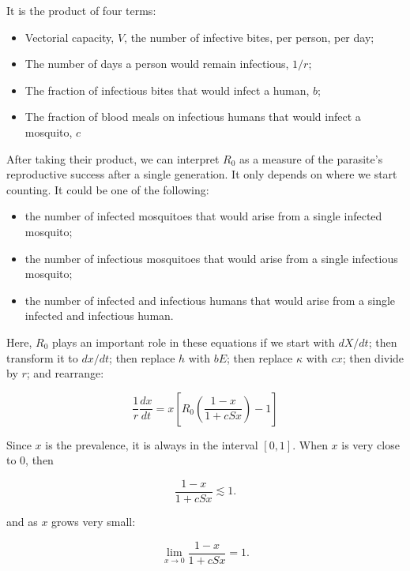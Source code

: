 \documentclass[
]{book}
\begin{document}
It is the product of four terms:

\begin{itemize}
\item
  Vectorial capacity, \(V\), the number of infective bites, per person, per day;
\item
  The number of days a person would remain infectious, \(1/r\);
\item
  The fraction of infectious bites that would infect a human, \(b\);
\item
  The fraction of blood meals on infectious humans that would infect a mosquito, \(c\)
\end{itemize}

After taking their product, we can interpret \(R_0\) as a measure of the parasite's reproductive success after a single generation. It only depends on where we start counting. It could be one of the following:

\begin{itemize}
\item
  the number of infected mosquitoes that would arise from a single infected mosquito;
\item
  the number of infectious mosquitoes that would arise from a single infectious mosquito;
\item
  the number of infected and infectious humans that would arise from a single infected and infectious human.
\end{itemize}

Here, \(R_0\) plays an important role in these equations if we start with \(dX/dt\); then transform it to \(dx/dt\); then replace \(h\) with \(bE\); then replace \(\kappa\) with \(cx\); then divide by \(r\); and rearrange:

\begin{equation}
\frac{1}{r} \frac{dx}{dt} = x \left[R_0 \left(\frac{1-x}{1 + cSx} \right)  - 1\right]  
\end{equation}

Since \(x\) is the prevalence, it is always in the interval \([0,1]\). When \(x\) is very close to \(0\), then

\begin{equation}
\frac{1-x}{1 + cSx} \lesssim 1. 
\end{equation}

and as \(x\) grows very small:

\begin{equation}
\lim_{x \rightarrow 0} \frac{1-x}{1 + cSx} = 1. 
\end{equation}
\end{document}
